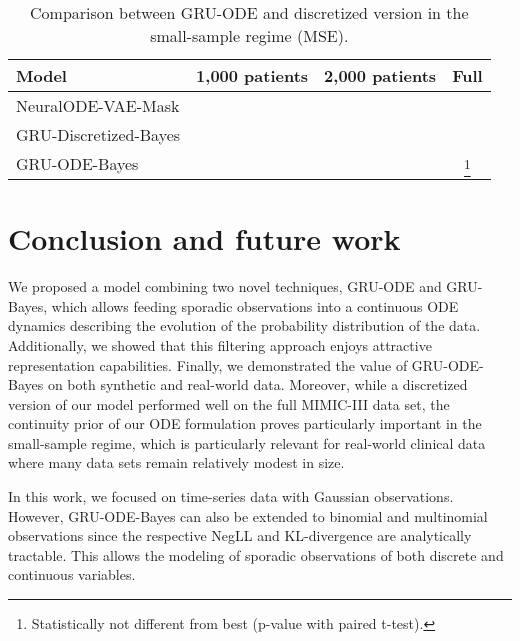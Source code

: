 \documentclass{article}
\newcommand{\method}{GRU-ODE-Bayes}
\newcounter{daggerfootnote}
\newcommand*{\daggerfootnote}[1]{\setcounter{daggerfootnote}{\value{footnote}}\renewcommand*{\thefootnote}{\fnsymbol{footnote}}\footnote[2]{#1}\setcounter{footnote}{\value{daggerfootnote}}\renewcommand*{\thefootnote}{\arabic{footnote}}}
\begin{document}
\begin{savenotes}
\begin{table}[htb]
\caption{Comparison between GRU-ODE and discretized version in the small-sample regime (MSE).}
\label{table:gru-disc}
\vskip 0.15in
\begin{center}
\begin{small}
\begin{sc}
\begin{tabular}{lccc}
\toprule
Model & \multicolumn{1}{c}{1,000 patients} & \multicolumn{1}{c}{2,000 patients} & \multicolumn{1}{c}{Full}  \\
\midrule




NeuralODE-VAE-Mask       &   &   &   \\ 
GRU-Discretized-Bayes &    &   &   \\
GRU-ODE-Bayes     &   &  &  \daggerfootnote{Statistically not different from best (p-value  with paired t-test).}   \\


\bottomrule
\end{tabular}
\end{sc}
\end{small}
\end{center}
\vskip -0.1in
\end{table}
\end{savenotes}


\section{Conclusion and future work}

We proposed a model combining two novel techniques, GRU-ODE and GRU-Bayes, which allows feeding sporadic observations into a  continuous ODE dynamics describing the evolution of the probability distribution of the data. Additionally, we showed that this filtering approach enjoys attractive representation capabilities. Finally, we demonstrated the value of \method{} on both synthetic and real-world data. Moreover, while a discretized version of our model performed well on the full MIMIC-III data set, the continuity prior of our ODE formulation proves particularly important in the small-sample regime, which is particularly relevant for real-world clinical data where many data sets remain relatively modest in size.

In this work, we focused on time-series data with Gaussian observations. However, \method{} can also be extended to binomial and multinomial observations since the respective NegLL and KL-divergence are analytically tractable. This allows the modeling of sporadic observations of both discrete and continuous variables. 
\end{document}
